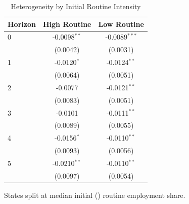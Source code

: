 \begin{table}[htbp]
\centering
\caption{Heterogeneity by Initial Routine Intensity}
\label{tab:routine_split}
\begin{tabular}{lcc}
\hline\hline
Horizon & High Routine & Low Routine \\
\hline
0 & -0.0098$^{**}$ & -0.0089$^{***}$ \\
 & (0.0042) & (0.0031) \\[3pt]
1 & -0.0120$^{*}$ & -0.0124$^{**}$ \\
 & (0.0064) & (0.0051) \\[3pt]
2 & -0.0077 & -0.0121$^{**}$ \\
 & (0.0083) & (0.0051) \\[3pt]
3 & -0.0101 & -0.0111$^{**}$ \\
 & (0.0089) & (0.0055) \\[3pt]
4 & -0.0156$^{*}$ & -0.0110$^{**}$ \\
 & (0.0093) & (0.0056) \\[3pt]
5 & -0.0210$^{**}$ & -0.0110$^{**}$ \\
 & (0.0097) & (0.0054) \\[3pt]
\hline\hline
\end{tabular}
\begin{tablenotes}\small
\item States split at median initial ({\statsBaseYear}) routine employment share.
\end{tablenotes}
\end{table}